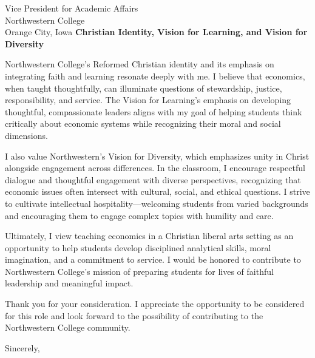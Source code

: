 \documentclass[11pt,letterpaper]{letter}
\begin{document}
\begin{letter}{
Vice President for Academic Affairs \\
Northwestern College \\
Orange City, Iowa
}
\textbf{Christian Identity, Vision for Learning, and Vision for Diversity}

Northwestern College’s Reformed Christian identity and its emphasis on integrating faith and learning resonate deeply with me. I believe that economics, when taught thoughtfully, can illuminate questions of stewardship, justice, responsibility, and service. The Vision for Learning’s emphasis on developing thoughtful, compassionate leaders aligns with my goal of helping students think critically about economic systems while recognizing their moral and social dimensions.

I also value Northwestern’s Vision for Diversity, which emphasizes unity in Christ alongside engagement across differences. In the classroom, I encourage respectful dialogue and thoughtful engagement with diverse perspectives, recognizing that economic issues often intersect with cultural, social, and ethical questions. I strive to cultivate intellectual hospitality—welcoming students from varied backgrounds and encouraging them to engage complex topics with humility and care.

Ultimately, I view teaching economics in a Christian liberal arts setting as an opportunity to help students develop disciplined analytical skills, moral imagination, and a commitment to service. I would be honored to contribute to Northwestern College’s mission of preparing students for lives of faithful leadership and meaningful impact.

Thank you for your consideration. I appreciate the opportunity to be considered for this role and look forward to the possibility of contributing to the Northwestern College community.

\closing{Sincerely,}

\end{letter}
\end{document}
